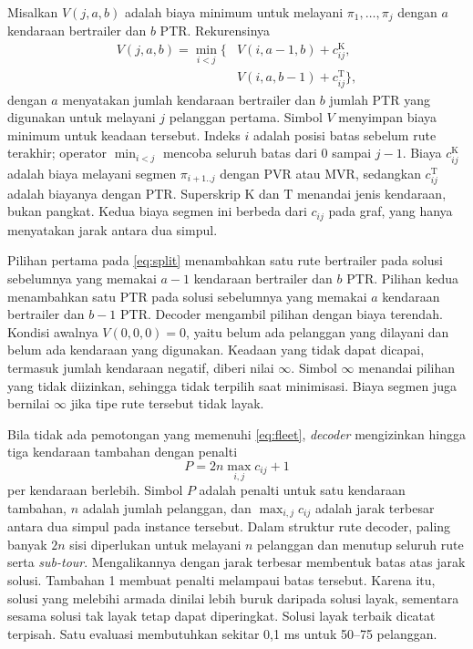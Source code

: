 \documentclass[conference]{IEEEtran}
\begin{document}
Misalkan $V(j,a,b)$ adalah biaya minimum untuk melayani $\pi_1,\dots,\pi_j$ dengan $a$ kendaraan bertrailer dan $b$ PTR. Rekurensinya
\begin{equation}
\begin{aligned}
V(j,a,b)=\min_{i<j}\bigl\{&V(i,a{-}1,b)+c^{\text{K}}_{ij},\\
&V(i,a,b{-}1)+c^{\text{T}}_{ij}\bigr\},
\end{aligned}\label{eq:split}
\end{equation}
dengan $a$ menyatakan jumlah kendaraan bertrailer dan $b$ jumlah PTR yang digunakan untuk melayani $j$ pelanggan pertama. Simbol $V$ menyimpan biaya minimum untuk keadaan tersebut. Indeks $i$ adalah posisi batas sebelum rute terakhir; operator $\min_{i<j}$ mencoba seluruh batas dari 0 sampai $j-1$. Biaya $c^{\text{K}}_{ij}$ adalah biaya melayani segmen $\pi_{i+1..j}$ dengan PVR atau MVR, sedangkan $c^{\text{T}}_{ij}$ adalah biayanya dengan PTR. Superskrip $\text{K}$ dan $\text{T}$ menandai jenis kendaraan, bukan pangkat. Kedua biaya segmen ini berbeda dari $c_{ij}$ pada graf, yang hanya menyatakan jarak antara dua simpul.

Pilihan pertama pada \eqref{eq:split} menambahkan satu rute bertrailer pada solusi sebelumnya yang memakai $a-1$ kendaraan bertrailer dan $b$ PTR. Pilihan kedua menambahkan satu PTR pada solusi sebelumnya yang memakai $a$ kendaraan bertrailer dan $b-1$ PTR. Decoder mengambil pilihan dengan biaya terendah. Kondisi awalnya $V(0,0,0)=0$, yaitu belum ada pelanggan yang dilayani dan belum ada kendaraan yang digunakan. Keadaan yang tidak dapat dicapai, termasuk jumlah kendaraan negatif, diberi nilai $\infty$. Simbol $\infty$ menandai pilihan yang tidak diizinkan, sehingga tidak terpilih saat minimisasi. Biaya segmen juga bernilai $\infty$ jika tipe rute tersebut tidak layak.

Bila tidak ada pemotongan yang memenuhi \eqref{eq:fleet}, \textit{decoder} mengizinkan hingga tiga kendaraan tambahan dengan penalti
\begin{equation}
P = 2n\max_{i,j}c_{ij} + 1\label{eq:pen}
\end{equation}
per kendaraan berlebih. Simbol $P$ adalah penalti untuk satu kendaraan tambahan, $n$ adalah jumlah pelanggan, dan $\max_{i,j}c_{ij}$ adalah jarak terbesar antara dua simpul pada instance tersebut. Dalam struktur rute decoder, paling banyak $2n$ sisi diperlukan untuk melayani $n$ pelanggan dan menutup seluruh rute serta \textit{sub-tour}. Mengalikannya dengan jarak terbesar membentuk batas atas jarak solusi. Tambahan 1 membuat penalti melampaui batas tersebut. Karena itu, solusi yang melebihi armada dinilai lebih buruk daripada solusi layak, sementara sesama solusi tak layak tetap dapat diperingkat. Solusi layak terbaik dicatat terpisah. Satu evaluasi membutuhkan sekitar 0,1 ms untuk 50--75 pelanggan.
\end{document}
